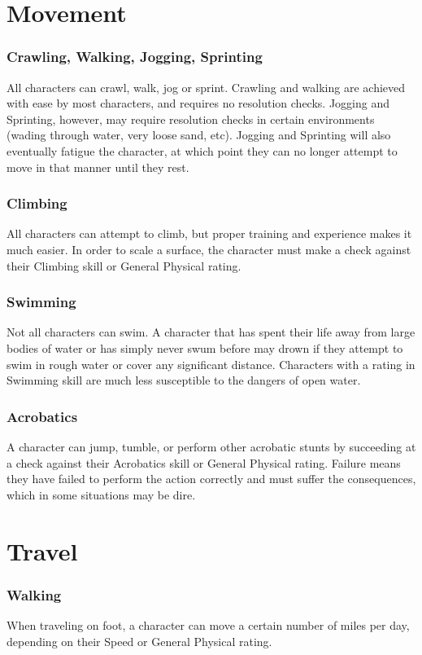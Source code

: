 \documentclass[oneside]{book}
\begin{document}
\begin{multicols}{2}
\section{Movement}
\subsubsection{Crawling, Walking, Jogging, Sprinting}
All characters can crawl, walk, jog or sprint. Crawling and walking are achieved with ease by most characters, and requires no resolution checks. Jogging and Sprinting, however, may require resolution checks in certain environments (wading through water, very loose sand, etc). Jogging and Sprinting will also eventually fatigue the character, at which point they can no longer attempt to move in that manner until they rest.

\subsubsection{Climbing}
All characters can attempt to climb, but proper training and experience makes it much easier. In order to scale a surface, the character must make a check against their Climbing skill or General Physical rating. 

\subsubsection{Swimming}
Not all characters can swim. A character that has spent their life away from large bodies of water or has simply never swum before may drown if they attempt to swim in rough water or cover any significant distance. Characters with a rating in Swimming skill are much less susceptible to the dangers of open water.

\subsubsection{Acrobatics}
A character can jump, tumble, or perform other acrobatic stunts by succeeding at a check against their Acrobatics skill or General Physical rating. Failure means they have failed to perform the action correctly and must suffer the consequences, which in some situations may be dire. 

\section{Travel}
\subsubsection{Walking}
When traveling on foot, a character can move a certain number of miles per day, depending on their Speed or General Physical rating.


\end{multicols}
\end{document}
